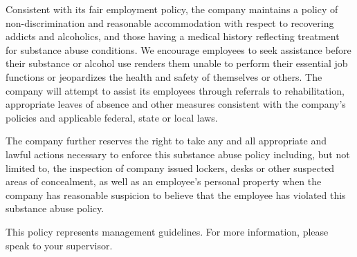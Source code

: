 Consistent with its fair employment policy, the company maintains a policy of non-discrimination and reasonable accommodation with respect to recovering addicts and alcoholics, and those having a medical history reflecting treatment for substance abuse conditions. We encourage employees to seek assistance before their substance or alcohol use renders them unable to perform their essential job functions or jeopardizes the health and safety of themselves or others. The company will attempt to assist its employees through referrals to rehabilitation, appropriate leaves of absence and other measures consistent with the company's policies and applicable federal, state or local laws.

The company further reserves the right to take any and all appropriate and lawful actions necessary to enforce this substance abuse policy including, but not limited to, the inspection of company issued lockers, desks or other suspected areas of concealment, as well as an employee's personal property when the company has reasonable suspicion to believe that the employee has violated this substance abuse policy.

This policy represents management guidelines. For more information, please speak to your supervisor.